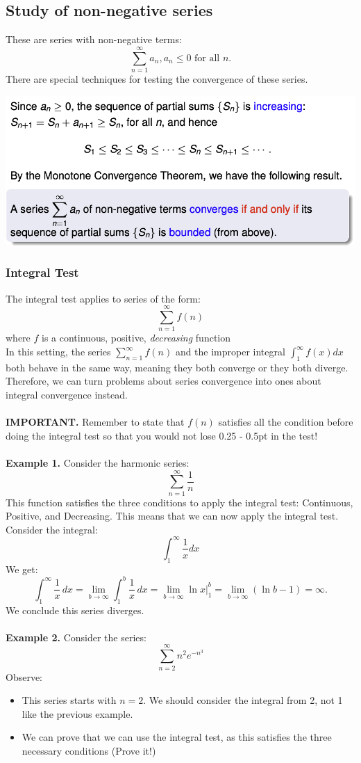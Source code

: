 \documentclass{article}
\begin{document}
\subsection{Study of non-negative series}
These are series with non-negative terms: 
$$ \sum_{n=1}^{\infty} a_n, a_n \leq 0 \text{ for all } n.$$
There are special techniques for testing the convergence of these series. \\
 \begin{center}
        \includegraphics[scale = 0.7]{non-negative series.png}
    \end{center} 

\subsubsection{Integral Test}
The integral test applies to series of the form:
$$ \sum_{n=1}^{\infty} f(n)$$
where $f$ is a continuous, positive, \textit{decreasing} function \\
In this setting, the series $ \sum_{n=1}^{\infty} f(n)$ and the improper integral $\int_1^{\infty} f(x) dx$ both behave in the same way, meaning they both converge or they both diverge. Therefore, we can turn problems about series convergence into ones about integral convergence instead. \\ \\ 
\textbf{IMPORTANT. }Remember to state that $f(n)$ satisfies all the condition before doing the integral test so that you would not lose 0.25 - 0.5pt in the test! \\ \\
\textbf{Example 1.} Consider the harmonic series: 
$$ \sum_{n=1}^{\infty} \frac{1}{n} $$
This function satisfies the three conditions to apply the integral test: Continuous, Positive, and Decreasing. This means that we can now apply the integral test. Consider the integral:
$$ \int_{1}^{\infty} \frac{1}{x} dx$$
We get:
$$ \int_{1}^{\infty} \frac{1}{x} \, dx = \lim_{b \to \infty} \int_{1}^{b} \frac{1}{x} \, dx = \lim_{b \to \infty} \ln x \Big|_{1}^{b} = \lim_{b \to \infty} (\ln b - 1) = \infty.$$
We conclude this series diverges. \\ \\
\textbf{Example 2.} Consider the series: 
$$ \sum_{n=2}^{\infty} n^2 e^{-n^3}$$
Observe: 
\begin{itemize}
    \item This series starts with $n=2$. We should consider the integral from 2, not 1 like the previous example.
    \item We can prove that we can use the integral test, as this satisfies the three necessary conditions (Prove it!)
\end{itemize}
\end{document}
